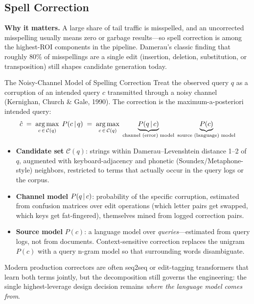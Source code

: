 \subsection{Spell Correction}
\label{sr:sec:spell_correction}

\textbf{Why it matters.} A large share of tail traffic is misspelled, and an uncorrected misspelling usually means zero or garbage results---so spell correction is among the highest-ROI components in the pipeline. Damerau's classic finding that roughly 80\% of misspellings are a single edit (insertion, deletion, substitution, or transposition) still shapes candidate generation today.

\begin{mathresult}{The Noisy-Channel Model of Spelling Correction}
Treat the observed query $q$ as a corruption of an intended query $c$ transmitted through a noisy channel (Kernighan, Church \& Gale, 1990). The correction is the maximum-a-posteriori intended query:
\begin{equation}
\hat{c} \;=\; \operatorname*{arg\,max}_{c \,\in\, \mathcal{C}(q)} \; P(c \,|\, q) \;=\; \operatorname*{arg\,max}_{c \,\in\, \mathcal{C}(q)} \; \underbrace{P(q \,|\, c)}_{\text{channel (error) model}} \; \underbrace{P(c)}_{\text{source (language) model}}
\end{equation}
\begin{itemize}
    \item \textbf{Candidate set} $\mathcal{C}(q)$: strings within Damerau--Levenshtein distance 1--2 of $q$, augmented with keyboard-adjacency and phonetic (Soundex/Metaphone-style) neighbors, restricted to terms that actually occur in the query logs or the corpus.
    \item \textbf{Channel model} $P(q \,|\, c)$: probability of the specific corruption, estimated from confusion matrices over edit operations (which letter pairs get swapped, which keys get fat-fingered), themselves mined from logged correction pairs.
    \item \textbf{Source model} $P(c)$: a language model over \textit{queries}---estimated from query logs, not from documents. Context-sensitive correction replaces the unigram $P(c)$ with a query n-gram model so that surrounding words disambiguate.
\end{itemize}
Modern production correctors are often seq2seq or edit-tagging transformers that learn both terms jointly, but the decomposition still governs the engineering: the single highest-leverage design decision remains \textit{where the language model comes from}.
\end{mathresult}

